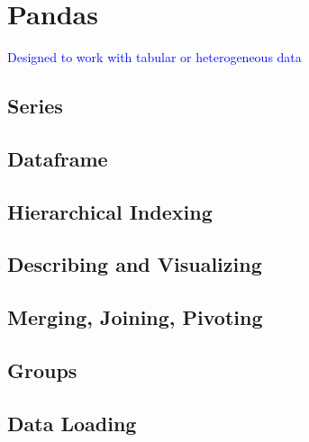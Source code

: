 \section{Pandas}

\textcolor{blue}{Designed to work with tabular or heterogeneous data}

\subsection{Series}

\subsection{Dataframe}

\subsection{Hierarchical Indexing}

\subsection{Describing and Visualizing}

\subsection{Merging, Joining, Pivoting}

\subsection{Groups}

\subsection{Data Loading}

